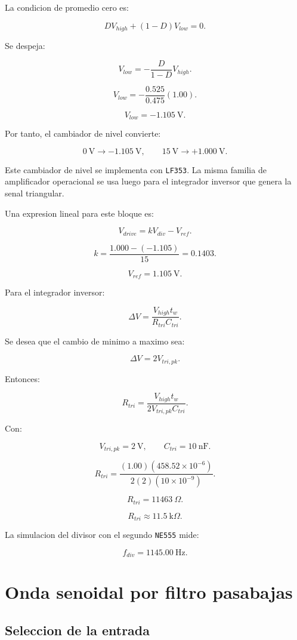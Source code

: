 \documentclass[11pt,letterpaper]{article}
\begin{document}
La condicion de promedio cero es:

\[
DV_{high}+(1-D)V_{low}=0.
\]

Se despeja:

\[
V_{low}=-\frac{D}{1-D}V_{high}.
\]

\[
V_{low}=-\frac{0.525}{0.475}(1.00).
\]

\[
\boxed{V_{low}=-1.105~\text{V}}.
\]

Por tanto, el cambiador de nivel convierte:

\[
0~\text{V}\rightarrow -1.105~\text{V},
\qquad
15~\text{V}\rightarrow +1.000~\text{V}.
\]

Este cambiador de nivel se implementa con \texttt{LF353}. La misma familia de
amplificador operacional se usa luego para el integrador inversor que genera la
senal triangular.

Una expresion lineal para este bloque es:

\[
V_{drive}=kV_{div}-V_{ref}.
\]

\[
k=\frac{1.000-(-1.105)}{15}=0.1403.
\]

\[
V_{ref}=1.105~\text{V}.
\]

Para el integrador inversor:

\[
\Delta V=\frac{V_{high}t_w}{R_{tri}C_{tri}}.
\]

Se desea que el cambio de minimo a maximo sea:

\[
\Delta V=2V_{tri,pk}.
\]

Entonces:

\[
R_{tri}=
\frac{V_{high}t_w}
{2V_{tri,pk}C_{tri}}.
\]

Con:

\[
V_{tri,pk}=2~\text{V},
\qquad
C_{tri}=10~\text{nF}.
\]

\[
R_{tri}=
\frac{(1.00)(458.52\times10^{-6})}
{2(2)(10\times10^{-9})}.
\]

\[
R_{tri}=11463~\Omega.
\]

\[
\boxed{R_{tri}\approx11.5~\text{k}\Omega}.
\]

La simulacion del divisor con el segundo \texttt{NE555} mide:

\[
f_{div}=1145.00~\text{Hz}.
\]

\section{Onda senoidal por filtro pasabajas}

\subsection{Seleccion de la entrada}
\end{document}
